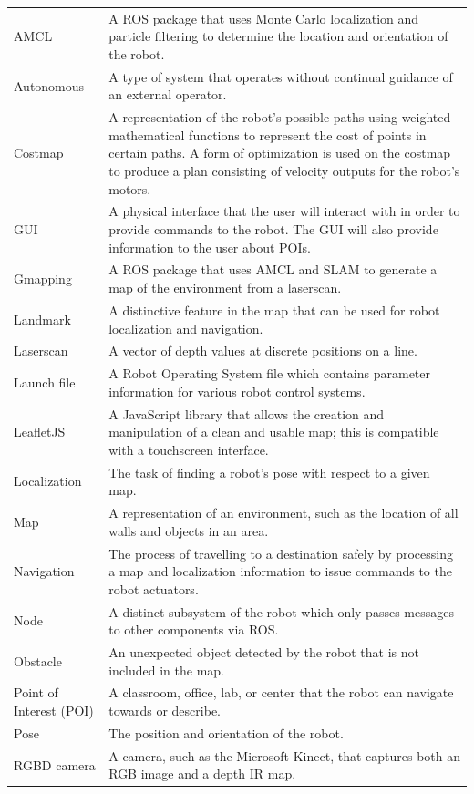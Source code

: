 \documentclass[11pt]{report}
\begin{document}
\begin{longtable}{p{3cm}p{9.9cm}}
\endlastfoot
AMCL&A ROS package that uses Monte Carlo localization and particle filtering to determine the location and orientation of the robot. \\
Autonomous&A type of system that operates without continual guidance of an external operator.\\
Costmap&A representation of the robot's possible paths using weighted mathematical functions to represent the cost of points in certain paths. A form of optimization is used on the costmap to produce a plan consisting of velocity outputs for the robot's motors.\\
GUI&A physical interface that the user will interact with in order to provide commands to the robot. The GUI will also provide information to the user about POIs.\\
Gmapping&A ROS package that uses AMCL and SLAM to generate a map of the environment from a laserscan.\\
Landmark&A distinctive feature in the map that can be used for robot localization and navigation. \\
Laserscan&A vector of depth values at discrete positions on a line.\\
Launch file&A Robot Operating System file which contains parameter information for various robot control systems.\\
LeafletJS&A JavaScript library that allows the creation and manipulation of a clean and usable map; this is compatible with a touchscreen interface.\\
Localization&The task of finding a robot's pose with respect to a given map.\\
Map&A representation of an environment, such as the location of all walls and objects in an area.\\
Navigation&The process of travelling to a destination safely by processing a map and localization information to issue commands to the robot actuators.\\
Node&A distinct subsystem of the robot which only passes messages to other components via ROS.\\
Obstacle&An unexpected object detected by the robot that is not included in the map.\\
Point of Interest (POI)&A classroom, office, lab, or center that the robot can navigate towards or describe.\\
Pose&The position and orientation of the robot.\\
RGBD camera&A camera, such as the Microsoft Kinect, that captures both an RGB image and a depth IR map.\\

\end{longtable}
\end{document}
